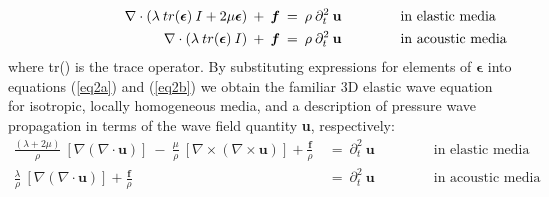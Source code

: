 \documentclass{article} %
\begin{document}
	\begin{subequations}
		\begin{align}
			\shoveright  \shoveright  \shoveright  \shoveright \shoveright \shoveright  \shoveright  \shoveright   
			\nabla \cdot (\lambda \: tr(\bm{\epsilon}) \: I + 2\mu \bm{\epsilon})  \:	+ \: \bm{f}   \: &= \:  \rho  \: \partial_{t}^{2} \: \mathbf{u} \: \quad \quad \quad \quad \text{in elastic media} 
			\label{eq2a} \\		
			\shoveright  \shoveright  \shoveright  \shoveright \shoveright \shoveright  \shoveright   \shoveright  				   
			\nabla \cdot (\lambda \: tr(\bm{\epsilon}) \: I ) 	\:	+ \: \bm{f} 				   \: &= \:  \rho  \: \partial_{t}^{2} \: \mathbf{u} \: \quad \quad \quad \quad \text{in acoustic media} 
			\label{eq2b}
		\end{align}
	\end{subequations} %
	where tr() is the trace operator. By substituting expressions for elements of $\bm{\epsilon}$ into equations (\ref{eq2a}) and (\ref{eq2b}) we obtain the familiar 3D elastic wave equation for isotropic, locally homogeneous media, and a description of pressure wave propagation in terms of the wave field quantity \textbf{u}, respectively:
	\begin{subequations}
		\begin{align}
			\frac{(\lambda + 2\mu)}{\rho} \: [\nabla (\nabla \cdot \bm{u})] \: - \: \frac{\mu}{\rho} \:[\nabla \times (\nabla \times \bm{u})]  +\frac{\bm{f}}{\rho}	\: &= \: \partial_{t}^{2} \: \mathbf{u} \: \quad \quad \quad \quad \text{in elastic media}
			\label{eq3a}   \\
			\frac{\lambda}{\rho} \: [\nabla (\nabla \cdot \bm{u})] +\frac{\bm{f}}{\rho}  \: &= \: \partial_{t}^{2} \: \mathbf{u} \:  \quad \quad \quad \quad \text{in acoustic media} 
			\label{eq3b} 
		\end{align} 
	\end{subequations} %
\end{document}
